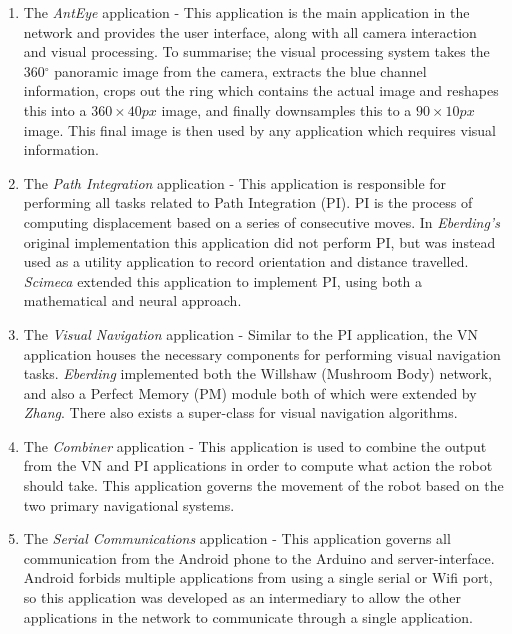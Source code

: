 \documentclass[a4paper,11pt,twoside,openright]{article}
\begin{document}
\begin{enumerate}
\item{
    The \textit{AntEye} application - This application is the main application in the network and
    provides the user interface, along with all camera interaction and visual processing. To summarise;
    the visual processing system takes the 360$^{\circ}$ panoramic image from the camera, extracts
    the blue channel information, crops out the ring which contains the actual image and reshapes
    this into a $360\times40px$ image, and finally downsamples this to a $90\times10px$ image. This
    final image is then used by any application which requires visual information.
  }

\item{
    The \textit{Path Integration} application - This application is responsible for performing all
    tasks related to Path Integration (PI). PI is the process of computing displacement
    based on a series of consecutive moves. In \textit{Eberding's} original implementation this
    application did not perform PI, but was instead used as a utility application to record orientation
    and distance travelled. \textit{Scimeca} extended this application to implement PI, using both a
    mathematical and neural approach.
  }

\item{
    The \textit{Visual Navigation} application - Similar to the PI application, the VN application
    houses the necessary components for performing visual navigation tasks. \textit{Eberding}
    implemented both the Willshaw (Mushroom Body) network, and also a Perfect Memory (PM) module both
    of which were extended by \textit{Zhang}. There also exists a super-class for visual navigation
    algorithms.
    }

\item{
    The \textit{Combiner} application - This application is used to combine the output from the
    VN and PI applications in order to compute what action the robot should take. This application
    governs the movement of the robot based on the two primary navigational systems.
  }

\item{
    The \textit{Serial Communications} application - This application governs all communication from
    the Android phone to the Arduino and server-interface. Android forbids multiple applications from
    using a single serial or Wifi port, so this application was developed as an intermediary to allow
    the other applications in the network to communicate through a single application.
    }
\end{enumerate}
\end{document}

